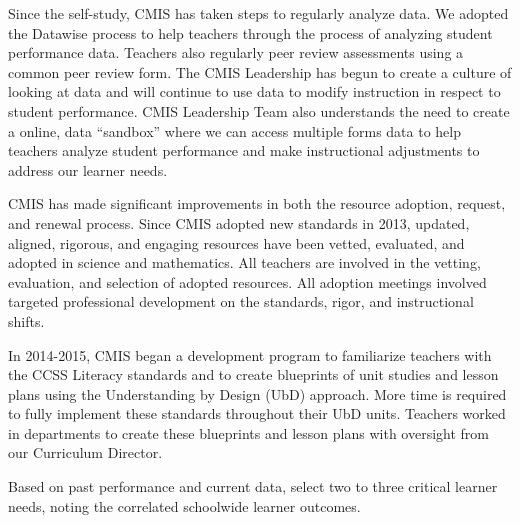 Since the self-study, CMIS has taken steps to regularly analyze data. We adopted the Datawise process to help teachers through the process of analyzing student performance data. Teachers also regularly peer review assessments using a common peer review form. The CMIS Leadership has begun to create a culture of looking at data and will continue to use data to modify instruction in respect to student performance. CMIS Leadership Team also understands the need to create a online, data “sandbox” where we can access multiple forms data to help teachers analyze student performance and make instructional adjustments to address our learner needs.

CMIS has made significant improvements in both the resource adoption, request, and renewal process. Since CMIS adopted new standards in 2013, updated, aligned, rigorous, and engaging resources have been vetted, evaluated, and adopted in science and mathematics. All teachers are involved in the vetting, evaluation, and selection of adopted resources. All adoption meetings involved targeted professional development on the standards, rigor, and instructional shifts. 

In 2014-2015, CMIS began a development program to familiarize teachers with the CCSS Literacy standards and to create blueprints of unit studies and lesson plans using the Understanding by Design (UbD) approach. More time is required to fully implement these standards throughout their UbD units. Teachers worked in departments to create these blueprints and lesson plans with oversight from our Curriculum Director.  


Based on past performance and current data, select two to three critical learner needs, noting the correlated schoolwide learner outcomes.

